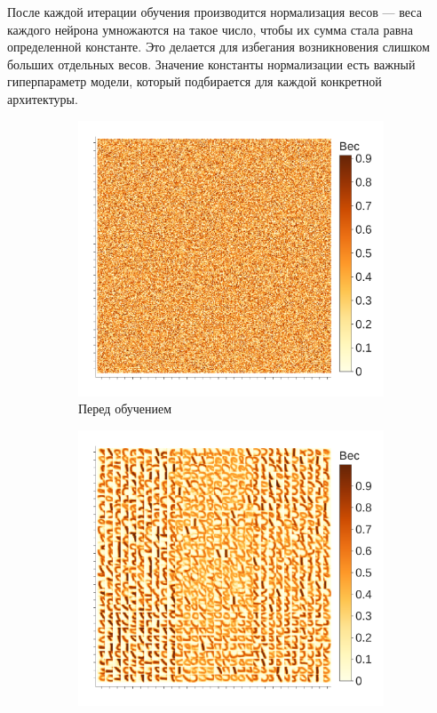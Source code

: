 \documentclass[a4paper]{article}
\begin{document}
После каждой итерации обучения производится нормализация весов --- веса каждого нейрона умножаются на такое число, чтобы их сумма стала равна определенной константе. Это делается для избегания возникновения слишком больших отдельных весов. Значение константы нормализации есть важный гиперпараметр модели, который подбирается для каждой конкретной архитектуры.

\begin{figure}
\centering
\begin{subfigure}{0.45\textwidth}
    \includegraphics[width=\textwidth,keepaspectratio=true]{weights_XY_untrained_ru.pdf}
    \caption{Перед обучением}
\end{subfigure}
\begin{subfigure}{0.45\textwidth}  \label{weights_XY}
    \includegraphics[width=\textwidth,keepaspectratio=true]{weights_XY_ru.pdf}

\end{subfigure}
\end{figure}
\end{document}
